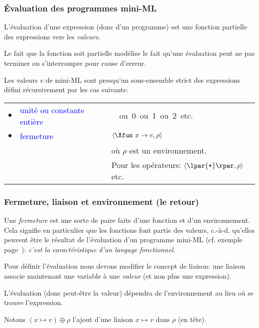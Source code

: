 
%
\begin{frame}
\frametitle{Évaluation des programmes mini-ML}

L'évaluation d'une expression (donc d'un programme) est une fonction
partielle des expressions vers les \emph{valeurs}. 

\bigskip

Le fait que la fonction soit partielle modélise le fait qu'une
évaluation peut ne pas terminer ou s'interrompre pour cause d'erreur.

\bigskip

Les valeurs $v$ de mini-ML sont presqu'un sous-ensemble strict des
expressions défini récursivement par les cas suivants:

\begin{tabular}{rll}
    $\bullet$
  & \textcolor{blue}{unité ou constante entière}
  & \unit \ ou \textsf{0} ou \textsf{1} ou \textsf{2} etc.\\
    $\bullet$
  & \textcolor{blue}{fermeture}
  & $\langle\Xfun \,\, x \rightarrow e, \rho\rangle$\\
 && où $\rho$ est un environnement.\\
  & 
  & Pour les opérateurs: $\langle\lpar{\texttt{+}}\rpar, \rho\rangle$ etc.
\end{tabular}

\end{frame}

%
\begin{frame}
\frametitle{Fermeture, liaison et environnement (le retour)}

Une \emph{fermeture} est une sorte de paire faite d'une fonction et
d'un environnement. Cela signifie en particulier que les fonctions
font partie des valeurs, c.-à-d. qu'elles peuvent être le résultat de
l'évaluation d'un programme mini-ML (cf. exemple
page~\pageref{maths}): \emph{c'est la caractéristique d'un langage
fonctionnel}.

\bigskip

Pour définir l'évaluation nous devons modifier le concept de liaison:
une liaison associe maintenant une variable à une \emph{valeur} (et
non plus une expression).

\bigskip

L'évaluation (donc peut-être la valeur) dépendra de l'environnement au
lieu où se trouve l'expression.

Notons $(x \mapsto v) \oplus \rho$ l'ajout d'une liaison $x \mapsto v$
dans $\rho$ (en tête).

\end{frame}

